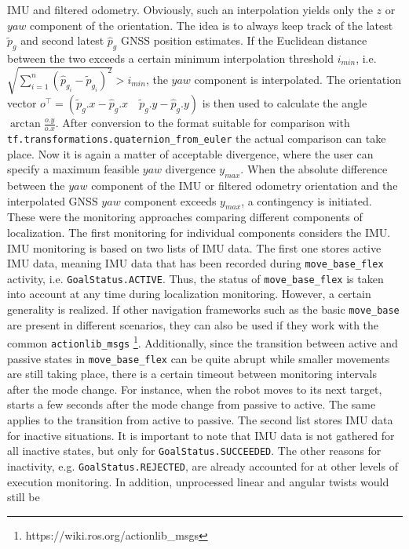 \documentclass[english, master, utf8]{base/thesis_KBS}
\newcommand{\code}[1]{\colorbox{light-gray}{\texttt{#1}}}
\begin{document}
IMU and filtered odometry. Obviously, such an interpolation yields only the $z$ or $yaw$ component of the orientation. The idea is to always keep track of the latest $\tilde{p}_{g}$
and second latest $\hat{p}_{g}$ GNSS position estimates. If the Euclidean distance between the two exceeds a certain minimum interpolation threshold $i_{min}$, i.e.
$\sqrt{\sum_{i=1}^{n}(\hat{p}_{g_{i}} - \tilde{p}_{g_i})^2} > i_{min}$, the $yaw$ component is interpolated. The orientation vector
$o^{\top} = (\tilde{p}_{g}.x - \hat{p}_{g}.x \quad \tilde{p}_{g}.y - \hat{p}_{g}.y)$ is then used to calculate the angle $\arctan{\frac{o.y}{o.x}}$. After conversion to the format
suitable for comparison with \code{tf.transformations.quaternion\_from\_euler} the actual comparison can take place. Now it is again a matter of acceptable divergence, where the
user can specify a maximum feasible $yaw$ divergence $y_{max}$. When the absolute difference between the $yaw$ component of the IMU or filtered odometry orientation and the interpolated GNSS
$yaw$ component exceeds $y_{max}$, a contingency is initiated.
These were the monitoring approaches comparing different components of localization. The first monitoring for individual components considers the IMU. IMU monitoring is based on two
lists of IMU data. The first one stores active IMU data, meaning IMU data that has been recorded during \code{move\_base\_flex} activity, i.e. \code{GoalStatus.ACTIVE}.
Thus, the status of \code{move\_base\_flex} is taken into account at any time during localization monitoring. However, a certain generality is realized.  If other navigation
frameworks such as the basic \code{move\_base} are present in different scenarios, they can also be used if they work with the common \code{actionlib\_msgs}
\footnote{https://wiki.ros.org/actionlib\_msgs}. Additionally, since the transition between active and passive states in \code{move\_base\_flex} can be quite abrupt while smaller
movements are still taking place, there is a certain timeout between monitoring intervals after the mode change. For instance, when the robot moves to its next target,
 starts a few seconds after the mode change from passive to active. The same applies to the transition from active to passive. The second list
stores IMU data for inactive situations. It is important to note that IMU data is not gathered for all inactive states, but only for \code{GoalStatus.SUCCEEDED}. The other reasons
for inactivity, e.g. \code{GoalStatus.REJECTED}, are already accounted for at other levels of execution monitoring. In addition, unprocessed linear and angular twists would still be
\end{document}
